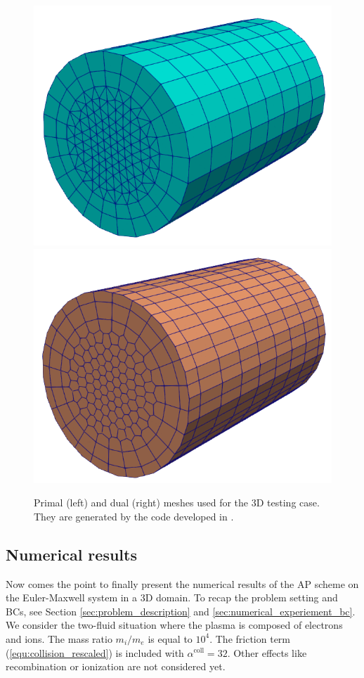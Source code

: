 \documentclass{article}
\begin{document}
\begin{figure}
    \centering
    \includegraphics[scale=0.4]{primal_mesh.png}
    \hspace{2cm}
    \includegraphics[scale=0.4]{dual_mesh.png}
    \caption{Primal (left) and dual (right) meshes used for the 3D testing case. They are generated by the code developed in \cite{fuchs_2021}.}
    \label{fig:primal_dual_meshes}
\end{figure}

\subsection{Numerical results}
Now comes the point to finally present the numerical results of the AP scheme on the Euler-Maxwell system in a 3D domain. To recap the problem setting and BCs, see Section \ref{sec:problem_description} and \ref{sec:numerical_experiement_bc}. We consider the two-fluid situation where the plasma is composed of electrons and ions. The mass ratio $m_i / m_e$ is equal to $10^4$. The friction term (\ref{equ:collision_rescaled}) is included with $\alpha^\text{coll} = 32$. Other effects like recombination or ionization are not considered yet.  
\end{document}
